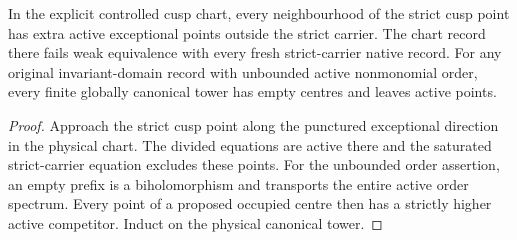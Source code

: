 \begin{theorem}
\label{hir:g8-original-chronological-limits}
\leanok
In the explicit controlled cusp chart, every neighbourhood
of the strict cusp point has extra active exceptional points
outside the strict carrier. The chart record there fails weak
equivalence with every fresh strict-carrier native record.
For any original invariant-domain record with unbounded active
nonmonomial order, every finite globally canonical tower has
empty centres and leaves active points.
\end{theorem}
\begin{proof}
Approach the strict cusp point along the punctured exceptional
direction in the physical chart. The divided equations are active
there and the saturated strict-carrier equation excludes these
points. For the unbounded order assertion, an empty prefix is
a biholomorphism and transports the entire active order spectrum.
Every point of a proposed occupied centre then has a strictly
higher active competitor. Induct on the physical canonical tower.
\end{proof}

